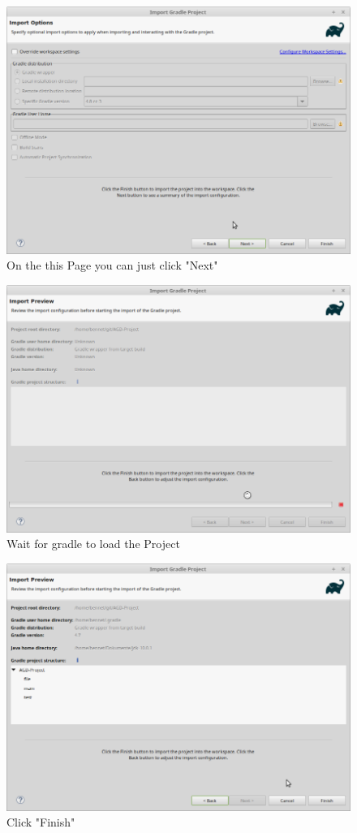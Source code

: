 \begin{figure}[H]
	\includegraphics[width=\textwidth]{setup-parts/pictures/eclipse-import-5.png}
	\caption{On the this Page you can just click "Next"}
\end{figure}
\begin{figure}[H]
	\includegraphics[width=\textwidth]{setup-parts/pictures/eclipse-import-6.png}
	\caption{Wait for gradle to load the Project}
\end{figure}
\begin{figure}[H]
	\includegraphics[width=\textwidth]{setup-parts/pictures/eclipse-import-7.png}
	\caption{Click "Finish"}
\end{figure}

